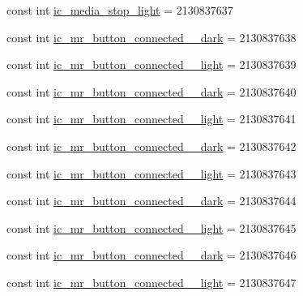 \begin{DoxyCompactItemize}
\item 
const int \mbox{\hyperlink{class_f_w_p_s___app_1_1_droid_1_1_resource_1_1_drawable_a73949147ac1845bcdc57573b8ef83bcc}{ic\+\_\+media\+\_\+stop\+\_\+light}} = 2130837637
\item 
const int \mbox{\hyperlink{class_f_w_p_s___app_1_1_droid_1_1_resource_1_1_drawable_ac091b291cc6f43f3b5f842bb7bcd4b74}{ic\+\_\+mr\+\_\+button\+\_\+connected\+\_\+\_\+dark}} = 2130837638
\item 
const int \mbox{\hyperlink{class_f_w_p_s___app_1_1_droid_1_1_resource_1_1_drawable_ab168d2a5d332f2c77a26bba26138fa4b}{ic\+\_\+mr\+\_\+button\+\_\+connected\+\_\+\_\+light}} = 2130837639
\item 
const int \mbox{\hyperlink{class_f_w_p_s___app_1_1_droid_1_1_resource_1_1_drawable_a298476922824e4cacca04ab9812ce627}{ic\+\_\+mr\+\_\+button\+\_\+connected\+\_\+\_\+dark}} = 2130837640
\item 
const int \mbox{\hyperlink{class_f_w_p_s___app_1_1_droid_1_1_resource_1_1_drawable_acda98fb1c5d0b8403aec2592577d4c70}{ic\+\_\+mr\+\_\+button\+\_\+connected\+\_\+\_\+light}} = 2130837641
\item 
const int \mbox{\hyperlink{class_f_w_p_s___app_1_1_droid_1_1_resource_1_1_drawable_a47062234b00b0ab5a0916d763ac48fbe}{ic\+\_\+mr\+\_\+button\+\_\+connected\+\_\+\_\+dark}} = 2130837642
\item 
const int \mbox{\hyperlink{class_f_w_p_s___app_1_1_droid_1_1_resource_1_1_drawable_aa379be70bd09c90a6e1a90e67592c706}{ic\+\_\+mr\+\_\+button\+\_\+connected\+\_\+\_\+light}} = 2130837643
\item 
const int \mbox{\hyperlink{class_f_w_p_s___app_1_1_droid_1_1_resource_1_1_drawable_a001015193342c6320b55f70ca50bdad3}{ic\+\_\+mr\+\_\+button\+\_\+connected\+\_\+\_\+dark}} = 2130837644
\item 
const int \mbox{\hyperlink{class_f_w_p_s___app_1_1_droid_1_1_resource_1_1_drawable_abdce5de7f6f797d89f12cb0d7ad58a76}{ic\+\_\+mr\+\_\+button\+\_\+connected\+\_\+\_\+light}} = 2130837645
\item 
const int \mbox{\hyperlink{class_f_w_p_s___app_1_1_droid_1_1_resource_1_1_drawable_af20d99c64bd1a69f46eda733991383d8}{ic\+\_\+mr\+\_\+button\+\_\+connected\+\_\+\_\+dark}} = 2130837646
\item 
const int \mbox{\hyperlink{class_f_w_p_s___app_1_1_droid_1_1_resource_1_1_drawable_ac577fafb825c8ff06eb28b67612da861}{ic\+\_\+mr\+\_\+button\+\_\+connected\+\_\+\_\+light}} = 2130837647
\item 

\end{DoxyCompactItemize}

